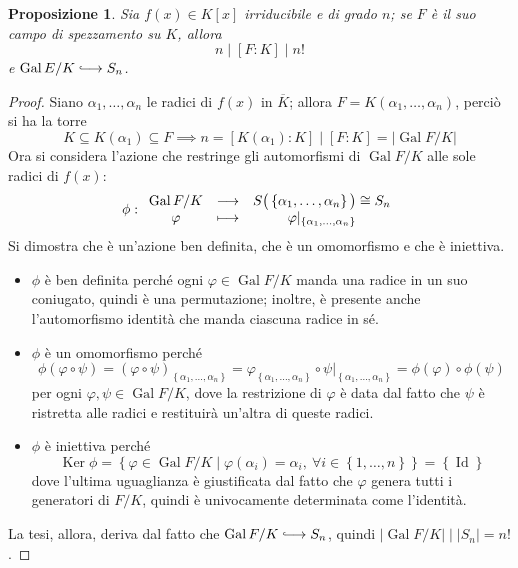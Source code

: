 \documentclass[12pt]{scrartcl}
\theoremstyle{style}
\newtheorem{prop}{Proposizione}[section]
\numberwithin{equation}{subsection}
\newcommand{\longhookrightarrow}{\lhook\joinrel\longrightarrow}
\begin{document}
\begin{prop}\label{pg1}
	Sia $f(x) \in K[x]$ irriducibile e di grado $n$; se $F$ \`e il suo campo di spezzamento su $K$, allora
	\[
		n  \mid [F:K]  \mid n!
	\] 
	e $\operatorname{Gal} E / K \longhookrightarrow S_n$.
\end{prop}
\begin{proof}
	Siano $\alpha _1,\ldots, \alpha _n$ le radici di $f(x)$ in $\overline{K}$; allora $F = K(\alpha _1,\ldots, \alpha _n)$, perci\`o si ha la torre
	\[
		K \subseteq K(\alpha _1) \subseteq F \implies n = [K(\alpha _1):K] \mid [F:K] = \lvert \operatorname{Gal} F / K \rvert 
	\] 
	Ora si considera l'azione che restringe gli automorfismi di $\operatorname{Gal} F / K$ alle sole radici di $f(x)$:
	\[
	\phi :
		\begin{array}
			{c c c}
\operatorname{Gal} F / K &\longrightarrow &S\big(\left\{ \alpha _1,\ldots,\alpha _n \right\} \big)\cong S_n\\
\varphi &\longmapsto & \varphi |_{\left\{ \alpha _1,\ldots,\alpha _n \right\} } 
		\end{array}
	\] 
	Si dimostra che \`e un'azione ben definita, che \`e un omomorfismo e che \`e iniettiva.
	\begin{itemize}
		\item $\phi $ \`e ben definita perch\'e ogni $\varphi  \in \operatorname{Gal} F / K$ manda una radice in un suo coniugato, quindi \`e una permutazione; inoltre, \`e presente anche l'automorfismo identit\`a che manda ciascuna radice in s\'e.
		\item $\phi$ \`e un omomorfismo perch\'e
			\[
				\phi (\varphi \circ \psi )=(\varphi \circ \psi )_{\left\{ \alpha _1,\ldots,\alpha _n \right\} }  = \varphi _{\left\{ \alpha _1,\ldots,\alpha _n \right\} } \circ \psi |_{\left\{ \alpha _1,\ldots,\alpha _n \right\} } = \phi (\varphi )\circ \phi (\psi )
			\] 
			per ogni $\varphi ,\psi \in \operatorname{Gal} F / K$, dove la restrizione di $\varphi $ \`e data dal fatto che $\psi $ \`e ristretta alle radici e restituir\`a un'altra di queste radici.
		\item $\phi $ \`e iniettiva perch\'e
			\[
			\operatorname{Ker} \phi = \left\{ \varphi \in \operatorname{Gal} F / K  \mid \varphi (\alpha _i)= \alpha _i, \ \forall i \in \left\{ 1,\ldots,n \right\}  \right\} = \left\{ \operatorname{Id}  \right\} 
			\] 
			dove l'ultima uguaglianza \`e giustificata dal fatto che $\varphi $ genera tutti i generatori di $F / K$, quindi \`e univocamente determinata come l'identit\`a.
	\end{itemize}
	La tesi, allora, deriva dal fatto che $\operatorname{Gal} F / K \longhookrightarrow S_n$, quindi $\lvert \operatorname{Gal} F / K \rvert  \mid \lvert S_n \rvert = n!$.
\end{proof}
\end{document}
